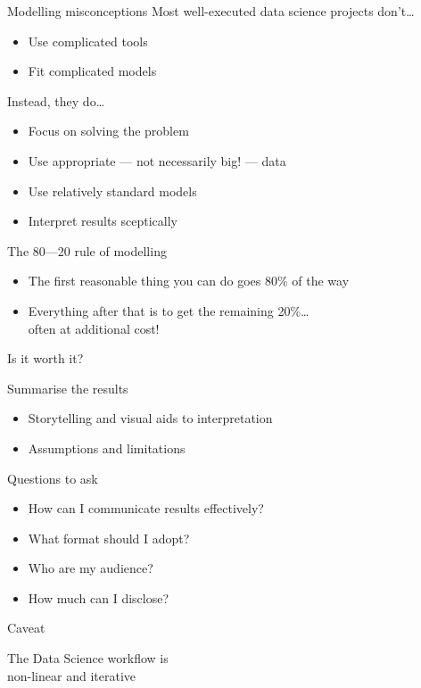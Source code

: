 \begin{frame}{Modelling misconceptions}
    Most well\hyp{}executed data science projects don't\ldots\vspace{-1ex}
    \begin{itemize}
        \item Use complicated tools
        \item Fit complicated models
    \end{itemize}
    \vfill
    Instead, they do\ldots\vspace{-1ex}
    \begin{itemize}
        \item \alert{Focus on solving the problem}
        \item Use appropriate --- not necessarily big! --- data
        \item Use relatively standard models
        \item Interpret results sceptically
    \end{itemize}
\end{frame}

\begin{frame}{The 80---20 rule of modelling}
    \begin{itemize}
        \item The first \alert{reasonable} thing you can do goes 80\% of the way
        \item Everything after that is to get the remaining 20\%\ldots \\
              often at additional cost!
    \end{itemize}
    \vfill\pause
    \begin{center}
        \LARGE%
        Is it worth it?
    \end{center}
\end{frame}

\begin{frame}[t]{Summarise the results}
    \begin{itemize}
        \item \alert{Storytelling} and \alert{visual aids} to interpretation
        \item Assumptions and limitations
    \end{itemize}
    \vfill
    \begin{block}{Questions to ask}
        \begin{itemize}
            \item How can I communicate results effectively?
            \item What format should I adopt?
            \item Who are my audience?
            \item How much can I disclose?
        \end{itemize}
    \end{block}
\end{frame}

\begin{frame}{Caveat}
    \begin{center}
        {\Large%
         The Data Science workflow is} \\[\bigskipamount]
        {\LARGE%
         \alert{non\hyp{}linear} and \alert{iterative}} \\[2\bigskipamount]
    \end{center}
\end{frame}




